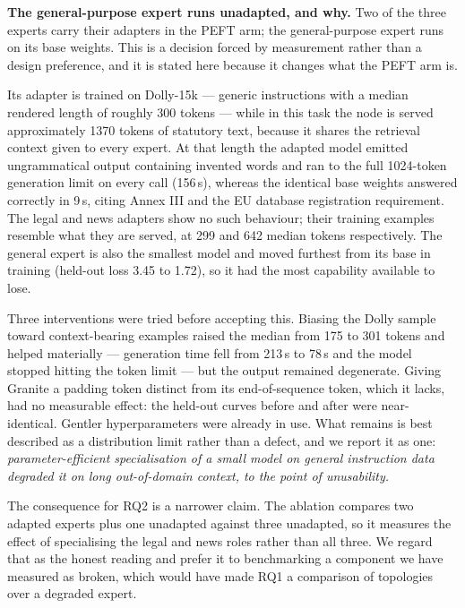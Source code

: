 \documentclass[journal,10pt,compsoc,onecolumn]{IEEEtran}
\begin{document}
\textbf{The general-purpose expert runs unadapted, and why.} Two of the three
experts carry their adapters in the PEFT arm; the general-purpose expert runs on
its base weights. This is a decision forced by measurement rather than a design
preference, and it is stated here because it changes what the PEFT arm is.

Its adapter is trained on Dolly-15k --- generic instructions with a median
rendered length of roughly 300 tokens --- while in this task the node is served
approximately 1370 tokens of statutory text, because it shares the retrieval
context given to every expert. At that length the adapted model emitted
ungrammatical output containing invented words and ran to the full 1024-token
generation limit on every call (156\,s), whereas the identical base weights
answered correctly in 9\,s, citing Annex III and the EU database registration
requirement. The legal and news adapters show no such behaviour; their training
examples resemble what they are served, at 299 and 642 median tokens
respectively. The general expert is also the smallest model and moved furthest
from its base in training (held-out loss 3.45 to 1.72), so it had the most
capability available to lose.

Three interventions were tried before accepting this. Biasing the Dolly sample
toward context-bearing examples raised the median from 175 to 301 tokens and
helped materially --- generation time fell from 213\,s to 78\,s and the model
stopped hitting the token limit --- but the output remained degenerate. Giving
Granite a padding token distinct from its end-of-sequence token, which it lacks,
had no measurable effect: the held-out curves before and after were
near-identical. Gentler hyperparameters were already in use. What remains is best
described as a distribution limit rather than a defect, and we report it as one:
\emph{parameter-efficient specialisation of a small model on general instruction
data degraded it on long out-of-domain context, to the point of unusability.}

The consequence for RQ2 is a narrower claim. The ablation compares two adapted
experts plus one unadapted against three unadapted, so it measures the effect of
specialising the legal and news roles rather than all three. We regard that as
the honest reading and prefer it to benchmarking a component we have measured as
broken, which would have made RQ1 a comparison of topologies over a degraded
expert.
\end{document}
